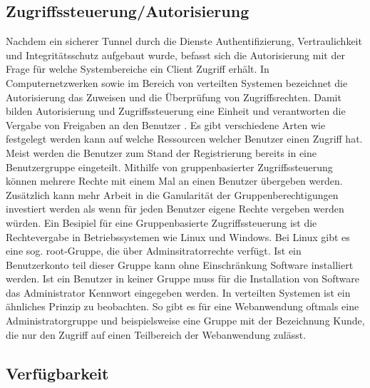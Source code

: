 \documentclass[utf8,biblatex]{lni}
\begin{document}
\subsection{Zugriffssteuerung/Autorisierung}

Nachdem ein sicherer Tunnel durch die Dienste Authentifizierung, Vertraulichkeit und 
Integritätsschutz aufgebaut wurde, befasst sich die Autorisierung mit der Frage für welche Systembereiche ein Client Zugriff erhält. 
In Computernetzwerken sowie im Bereich von verteilten Systemen bezeichnet die Autorisierung das Zuweisen 
und die Überprüfung von Zugriffsrechten. Damit bilden Autorisierung und Zugriffssteuerung eine Einheit und 
verantworten die Vergabe von Freigaben an den Benutzer \cite{Bedner.2010}. 
Es gibt verschiedene Arten wie festgelegt werden kann auf welche Ressourcen welcher Benutzer einen Zugriff hat. 
Meist werden die Benutzer zum Stand der Registrierung bereits in eine Benutzergruppe eingeteilt. 
Mithilfe von gruppenbasierter Zugriffssteuerung können mehrere Rechte mit einem Mal an einen Benutzer übergeben werden. 
Zusätzlich kann mehr Arbeit in die Ganularität der Gruppenberechtigungen investiert werden als 
wenn für jeden Benutzer eigene Rechte vergeben werden würden. 
Ein Besipiel für eine Gruppenbasierte Zugriffssteuerung ist die Rechtevergabe in Betriebssystemen wie Linux und Windows.
Bei Linux gibt es eine sog. \glqq root\grqq{}-Gruppe, die über Adminsitratorrechte verfügt. Ist ein Benutzerkonto teil dieser Gruppe
kann ohne Einschränkung Software installiert werden. Ist ein Benutzer in keiner Gruppe muss für die Installation von Software 
das Administrator Kennwort eingegeben werden. 
In verteilten Systemen ist ein ähnliches Prinzip zu beobachten. So gibt es für eine Webanwendung oftmals 
eine Administratorgruppe und beispielsweise eine Gruppe mit der Bezeichnung \glqq Kunde\grqq{}, die nur den Zugriff auf 
einen Teilbereich der Webanwendung zulässt. \cite{Kriha.2008} 

\subsection{Verfügbarkeit}
\end{document}

